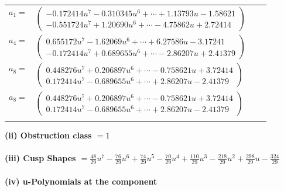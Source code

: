 \documentclass[1p]{elsarticle_modified}
\theoremstyle{definition}
\begin{document}
\begin{tabular}{m{7pt} m{180pt} m{7pt} m{180pt} }
\flushright $a_{1}=$&$\begin{pmatrix}-0.172414 u^{7}-0.310345 u^{6}+\cdots+1.13793 u-1.58621\\-0.551724 u^{7}+1.20690 u^{6}+\cdots-4.75862 u+2.72414\end{pmatrix}$ \\
\flushright $a_{4}=$&$\begin{pmatrix}0.655172 u^{7}-1.62069 u^{6}+\cdots+6.27586 u-3.17241\\-0.172414 u^{7}+0.689655 u^{6}+\cdots-2.86207 u+2.41379\end{pmatrix}$ \\
\flushright $a_{8}=$&$\begin{pmatrix}0.448276 u^{7}+0.206897 u^{6}+\cdots-0.758621 u+3.72414\\0.172414 u^{7}-0.689655 u^{6}+\cdots+2.86207 u-2.41379\end{pmatrix}$\\ \flushright $a_{8}=$&$\begin{pmatrix}0.448276 u^{7}+0.206897 u^{6}+\cdots-0.758621 u+3.72414\\0.172414 u^{7}-0.689655 u^{6}+\cdots+2.86207 u-2.41379\end{pmatrix}$\\&\end{tabular}
\flushleft \textbf{(ii) Obstruction class $= 1$}\\~\\
\flushleft \textbf{(iii) Cusp Shapes $= \frac{48}{29} u^7-\frac{76}{29} u^6+\frac{74}{29} u^5-\frac{70}{29} u^4+\frac{110}{29} u^3-\frac{218}{29} u^2+\frac{298}{29} u-\frac{324}{29}$}\\~\\
\newpage\renewcommand{\arraystretch}{1}
\flushleft \textbf{(iv) u-Polynomials at the component}\newline \\
\end{document}
